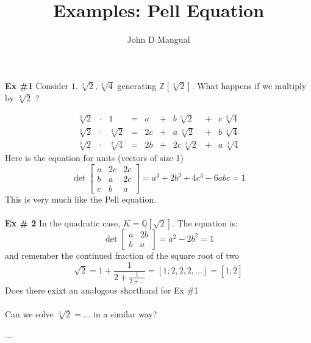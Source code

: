 \documentclass[12pt]{article}
\title{\textbf{ Examples: Pell Equation}}
\author{John D Mangual}
\date{}
\newcommand{\two }{\sqrt[3]{2}}
\newcommand{\four}{\sqrt[3]{4}}
\begin{document}
\selectfont \fontsize{25}{30}\selectfont

\maketitle

\noindent \textbf{Ex \#1} Consider $1, \sqrt[3]{2}, \sqrt[3]{4}$ generating $\mathbb{Z}[\sqrt[3]{2}]$.  What happens if we multiply by $\sqrt[3]{2}$ ?

$$
\begin{array}{ccccrcrcr}
\two &\cdot& 1 &=& a &+& b \,\two &+& c \,\four \\
\two &\cdot& \two &=& 2c &+& a \,\two &+& b \,\four \\
\two &\cdot& \four &=& 2b &+& 2c \,\two &+& a \,\four 
\end{array}
$$
Here is the equation for units (vectors of size 1)
$$ \det \left[
\begin{array}{ccc}
a & 2c & 2c \\
b & a & 2c \\
c & b & a
\end{array}
 \right] = a^3 + 2b^3 + 4c^3 - 6abc = 1 $$
 This is very much like the Pell equation. \\ \\
 \textbf{Ex \# 2} In the quadratic case, $K = \mathbb{Q}[\sqrt{2}]$.  The equation is:
 $$ \det \left[\begin{array}{cc} a & 2b \\ b & a\end{array} \right] = a^2 - 2b^2 = 1$$
 and remember the continued fraction of the square root of two
 $$ \sqrt{2} = 1 + \frac{1}{2 + \frac{1}{2 + \dots } }  = [1; 2,2,2,\dots ] = [1; \overline{2}]$$
Does there exixt an analogous shorthand for Ex \#1\\ \\
Can we solve $\sqrt[3]{2} = \dots $ in a similar way?

\newpage

\selectfont \fontsize{12}{10}\selectfont


\begin{thebibliography}{}

\item ...


\end{thebibliography}
\end{document}
